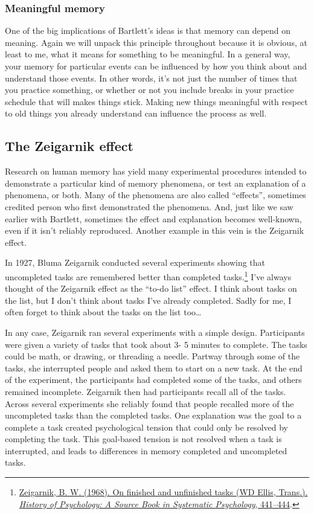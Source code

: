 \documentclass[
  oneside,
  12pt]{crumpbook}
\begin{document}
\hypertarget{meaningful-memory}{%
\subsubsection{Meaningful memory}\label{meaningful-memory}}

One of the big implications of Bartlett's ideas is that memory can depend on meaning. Again we will unpack this principle throughout because it is obvious, at least to me, what it means for something to be meaningful. In a general way, your memory for particular events can be influenced by how you think about and understand those events. In other words, it's not just the number of times that you practice something, or whether or not you include breaks in your practice schedule that will makes things stick. Making new things meaningful with respect to old things you already understand can influence the process as well.

\hypertarget{the-zeigarnik-effect}{%
\subsection{The Zeigarnik effect}\label{the-zeigarnik-effect}}

Research on human memory has yield many experimental procedures intended to demonstrate a particular kind of memory phenomena, or test an explanation of a phenomena, or both. Many of the phenomena are also called ``effects'', sometimes credited person who first demonstrated the phenomena. And, just like we saw earlier with Bartlett, sometimes the effect and explanation becomes well-known, even if it isn't reliably reproduced. Another example in this vein is the Zeigarnik effect.

In 1927, Bluma Zeigarnik conducted several experiments showing that uncompleted tasks are remembered better than completed tasks.\footnote{\protect\hyperlink{ref-zeigarnikFinishedUnfinishedTasks1968}{Zeigarnik, B. W. (1968). On finished and unfinished tasks ({WD Ellis}, {Trans}.). \emph{History of Psychology: A Source Book in Systematic Psychology}, 441--444}.} I've always thought of the Zeigarnik effect as the ``to-do list'' effect. I think about tasks on the list, but I don't think about tasks I've already completed. Sadly for me, I often forget to think about the tasks on the list too\ldots{}

In any case, Zeigarnik ran several experiments with a simple design. Participants were given a variety of tasks that took about 3- 5 minutes to complete. The tasks could be math, or drawing, or threading a needle. Partway through some of the tasks, she interrupted people and asked them to start on a new task. At the end of the experiment, the participants had completed some of the tasks, and others remained incomplete. Zeigarnik then had participants recall all of the tasks. Across several experiments she reliably found that people recalled more of the uncompleted tasks than the completed tasks. One explanation was the goal to a complete a task created psychological tension that could only be resolved by completing the task. This goal-based tension is not resolved when a task is interrupted, and leads to differences in memory completed and uncompleted tasks.
\end{document}
